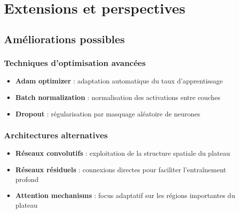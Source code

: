 \documentclass[12pt,a4paper]{report}
\numberwithin{equation}{section}
\begin{document}
\chapter{Extensions et perspectives}

\section{Améliorations possibles}

\subsection{Techniques d'optimisation avancées}
\begin{itemize}
  \item \textbf{Adam optimizer} : adaptation automatique du taux d'apprentissage
  \item \textbf{Batch normalization} : normalisation des activations entre couches
  \item \textbf{Dropout} : régularisation par masquage aléatoire de neurones
\end{itemize}

\subsection{Architectures alternatives}
\begin{itemize}
  \item \textbf{Réseaux convolutifs} : exploitation de la structure spatiale du plateau
  \item \textbf{Réseaux résiduels} : connexions directes pour faciliter l'entraînement profond
  \item \textbf{Attention mechanisms} : focus adaptatif sur les régions importantes du plateau
\end{itemize}


\end{document}
